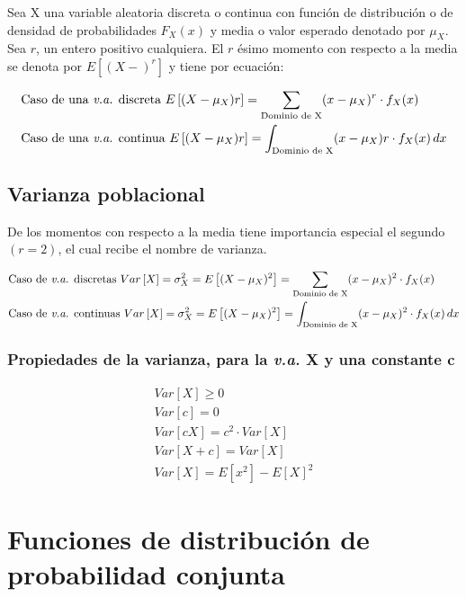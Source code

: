 Sea X una variable aleatoria discreta o continua
con función de distribución o de densidad de probabilidades $F_X(x)$ y media o valor esperado denotado por $\mu_X$. Sea $r$, un entero positivo cualquiera. El $r$ ésimo momento con respecto a la media se denota por $E\left[(X-)^r\right]$ y tiene por ecuación:

\begin{align*}
     & \text{Caso de una \textit{v.a.} discreta }E\left[ (X-\mu_X)r\right]= \sum_{\text{Dominio de X}}( x-\mu_X)^r\cdot f_X(x)    \\
     & \text{Caso de una \textit{v.a.} continua }E\left[ (X-\mu_X)r\right]= \int_{\text{Dominio de X}}( x-\mu_X)r\cdot f_X(x)\,dx
\end{align*}

\subsection{Varianza poblacional}

De los momentos con respecto a la media tiene
importancia especial el segundo $(r=2)$, el cual
recibe el nombre de varianza.

\begin{align*}
     & \text{Caso de \textit{v.a.} discretas }Var\left[ X \right]=\sigma_X^2=E\left[( X-\mu_X)^2\right]=\sum_{\text{Dominio de X}}(x-\mu_X)^2\cdot f_X(x)       \\
     & \text{Caso de \textit{v.a.} continuas }Var\left[X \right]=\sigma_X^2 =E\left[ ( X-\mu_X)^2\right]= \int_{\text{Dominio de X}}(x-\mu_X)^2\cdot f_X(x)\,dx
\end{align*}


\subsubsection{Propiedades de la varianza, para la \textit{v.a.} X y una constante c}

\begin{align}
    Var\left[X\right]\geq 0                       \\
    Var\left[c\right]=0                           \\
    Var\left[cX\right]=c^2\cdot Var\left[X\right] \\
    Var\left[X+c\right]=Var\left[X\right]         \\
    Var\left[X\right]=E\left[x^2\right]-E\left[ X\right]^2
\end{align}

\section{Funciones de distribución de probabilidad conjunta}

